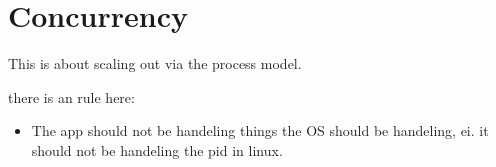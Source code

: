 \section*{Concurrency}
This is about scaling out via the process model.

there is an rule here:
\begin{itemize}
\item The app should not be handeling things the OS should be handeling, ei. it should not be handeling the pid in linux.
\end{itemize}